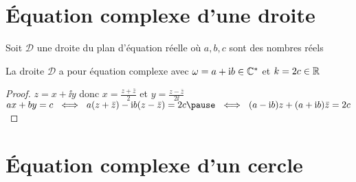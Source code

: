\section{\'Equation complexe d'une droite}


\begin{frame}

\begin{minipage}{0.6\linewidth}
Soit $\mathcal{D}$ une {\color{blue} droite du plan} d'équation réelle
où $a,b,c$ sont des nombres réels
\end{minipage}
\begin{minipage}{0.39\linewidth}
\vspace*{-4ex}
\end{minipage}

\bigskip

\pause
La droite $\mathcal{D}$ a pour équation complexe 
avec $\omega = a+\mathrm{i}  b \in \mathbb{C}^*$ et $k=2c \in \mathbb{R}$



\pause
\begin{proof}
$z=x+\ii y$ 
\pause
\quad donc \quad  $x = \frac{z+\bar z}{2}$ et $y = \frac{z - \bar z}{2 \ii }$\\
\pause
$ax+by=c\ \iff\  a(z+\bar z) -\ii  b(z-\bar z)=2c
\pause\ \iff\ (a-\ii  b)z+(a+\ii  b)\bar z = 2c$\\
\end{proof}


\end{frame}


\section{\'Equation complexe d'un cercle}


